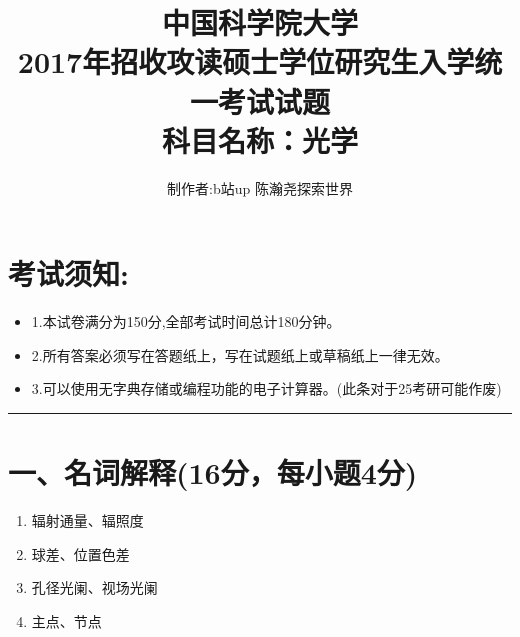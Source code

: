 \documentclass[11pt,a4paper]{article}
\begin{document}
    \title{中国科学院大学\\2017年招收攻读硕士学位研究生入学统一考试试题\\科目名称：光学}
    \author{制作者:b站up 陈瀚尧探索世界}
    \date{}
    \maketitle
    \titleformat{\section}[block]{\normalfont\Large\bfseries}{}{0pt}{}


    \section{考试须知:}
    \begin{itemize}[topsep=0pt,itemsep=0pt,partopsep=0pt]
        \item 1.本试卷满分为150分,全部考试时间总计180分钟。
        \vspace{-3mm}
        \item 2.所有答案必须写在答题纸上，写在试题纸上或草稿纸上一律无效。
        \vspace{-3mm}
        \item 3.可以使用无字典存储或编程功能的电子计算器。(此条对于25考研可能作废)
    \end{itemize}
    \vspace{-5mm}
    \noindent\rule{\textwidth}{0.5pt} %
    \vspace{-12mm}
    \section*{一、名词解释(16分，每小题4分)}
    \begin{enumerate}
        \vspace{0mm}
        \item 辐射通量、辐照度
        \vspace{15mm}
        \item 球差、位置色差
        \vspace{15mm}
        \item 孔径光阑、视场光阑
        \vspace{15mm}
        \item 主点、节点
        \vspace{15mm}
    \end{enumerate}
\end{document}
